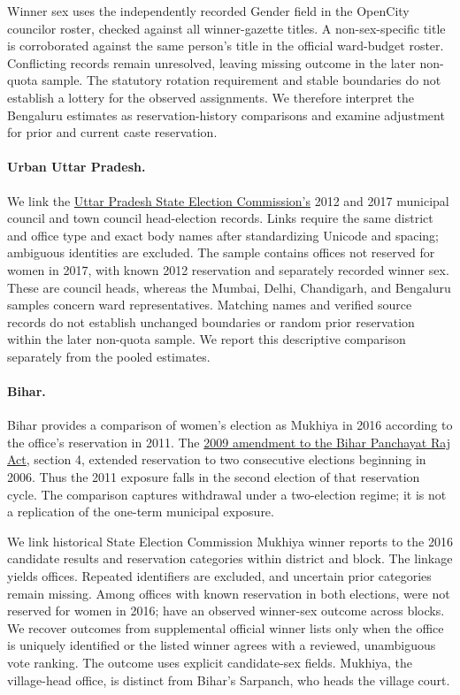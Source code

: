 Winner sex uses the independently recorded Gender field in the OpenCity councilor roster, checked against all winner-gazette titles. A non-sex-specific title is corroborated against the same person's title in the official ward-budget roster. Conflicting records remain unresolved, leaving \appBengaluruMissing{} missing outcome in the later non-quota sample. The statutory rotation requirement and stable boundaries do not establish a lottery for the observed assignments. We therefore interpret the Bengaluru estimates as reservation-history comparisons and examine adjustment for prior and current caste reservation.

\paragraph{Urban Uttar Pradesh.}\label{sec:up_urban}
We link the \href{https://sec.up.nic.in/}{Uttar Pradesh State Election Commission's} 2012 and 2017 municipal council and town council head-election records. Links require the same district and office type and exact body names after standardizing Unicode and spacing; ambiguous identities are excluded. The sample contains \appUpUrbanN{} offices not reserved for women in 2017, with known 2012 reservation and separately recorded winner sex. These are council heads, whereas the Mumbai, Delhi, Chandigarh, and Bengaluru samples concern ward representatives. Matching names and verified source records do not establish unchanged boundaries or random prior reservation within the later non-quota sample. We report this descriptive comparison separately from the pooled estimates.

\paragraph{Bihar.} Bihar provides a comparison of women's election as Mukhiya in 2016 according to the office's reservation in 2011. The \href{https://sec.bihar.gov.in/Documents/Panchayat_Act_Rule/ACT_Bihar%20Panchayat%20Raj%20Amendment%20Act%202009.pdf}{2009 amendment to the Bihar Panchayat Raj Act}, section 4, extended reservation to two consecutive elections beginning in 2006. Thus the 2011 exposure falls in the second election of that reservation cycle. The comparison captures withdrawal under a two-election regime; it is not a replication of the one-term municipal exposure.

We link historical State Election Commission Mukhiya winner reports to the 2016 candidate results and reservation categories within district and block. The linkage yields \appBiharLinked{} offices. Repeated identifiers are excluded, and uncertain prior categories remain missing. Among offices with known reservation in both elections, \appBiharEligible{} were not reserved for women in 2016; \appBiharN{} have an observed winner-sex outcome across \appBiharBlocks{} blocks. We recover outcomes from supplemental official winner lists only when the office is uniquely identified or the listed winner agrees with a reviewed, unambiguous vote ranking. The outcome uses explicit candidate-sex fields. Mukhiya, the village-head office, is distinct from Bihar's Sarpanch, who heads the village court.

